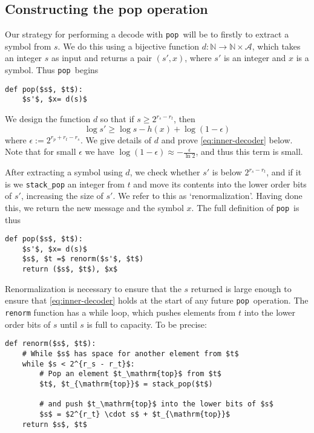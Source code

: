 \documentclass{article}
\newcommand{\pop}{\texttt{pop}}
\begin{document}
\subsection*{Constructing the pop operation}
Our strategy for performing a decode with \pop\ will be to firstly to extract a
symbol from $s$. We do this using a bijective function $d:\mathbb
N\rightarrow\mathbb N\times\mathcal{A}$, which takes an integer $s$ as input
and returns a pair $(s', x)$, where $s'$ is an integer and $x$ is a symbol.
Thus \pop\ begins
\begin{lstlisting}
def pop($s$, $t$):
    $s'$, $x= d(s)$
\end{lstlisting}
We design the function $d$ so that if $s\geq 2^{r_s - r_t}$, then
\begin{equation}\label{eq:inner-decoder}
  \log s'\geq\log s - h(x) + \log (1 - \epsilon)
\end{equation}
where $\epsilon := 2^{r_p + r_t - r_s}$. We give details of $d$ and prove
\cref{eq:inner-decoder} below. Note that for small $\epsilon$ we have $\log (1
- \epsilon) \approx -\frac{\epsilon}{\ln2}$, and thus this term is small.

After extracting a symbol using $d$, we check whether $s'$ is below $2^{r_s -
r_t}$, and if it is we \texttt{stack\_pop} an integer from $t$ and move its
contents into the lower order bits of $s'$, increasing the size of $s'$. We
refer to this as `renormalization'. Having done this, we return the new message
and the symbol $x$. The full definition of \pop\ is thus
\begin{lstlisting}
def pop($s$, $t$):
    $s'$, $x= d(s)$
    $s$, $t =$ renorm($s'$, $t$)
    return ($s$, $t$), $x$
\end{lstlisting}

Renormalization is necessary to ensure that the $s$ returned is large enough to
ensure that \cref{eq:inner-decoder} holds at the start of any future \pop\
operation. The \texttt{renorm} function has a while loop, which pushes elements
from $t$ into the lower order bits of $s$ until $s$ is full to capacity. To be
precise:

\begin{lstlisting}
def renorm($s$, $t$):
    # While $s$ has space for another element from $t$
    while $s < 2^{r_s - r_t}$:
        # Pop an element $t_\mathrm{top}$ from $t$
        $t$, $t_{\mathrm{top}}$ = stack_pop($t$)

        # and push $t_\mathrm{top}$ into the lower bits of $s$
        $s$ = $2^{r_t} \cdot s$ + $t_{\mathrm{top}}$
    return $s$, $t$
\end{lstlisting}
\end{document}
